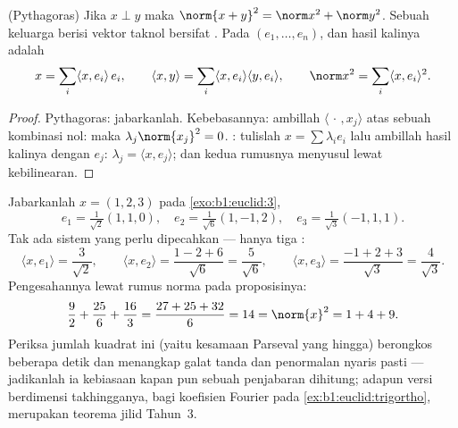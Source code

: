 \begin{proposition}\label{prop:b1:euclid:orthfree}
(Pythagoras) Jika $x \perp y$ maka
$\norm{x+y}^2 = \norm x^2 + \norm y^2$. Sebuah keluarga  berisi
vektor taknol bersifat . Pada   $(e_1, \dots,
e_n)$,  dan hasil kalinya adalah
\[
x = \sum_{i} \langle x, e_i\rangle\, e_i,
\qquad
\langle x, y \rangle = \sum_i \langle x, e_i\rangle \langle y,
e_i\rangle,
\qquad
\norm x^2 = \sum_i \langle x, e_i\rangle^2 .
\]
\end{proposition}

\begin{proof}
Pythagoras: jabarkanlah. Kebebasannya: ambillah $\langle\,\cdot\,, x_j\rangle$
atas sebuah kombinasi nol: maka $\lambda_j \norm{x_j}^2 = 0$. :
tulislah $x = \sum \lambda_i e_i$ lalu ambillah hasil kalinya dengan $e_j$:
$\lambda_j = \langle x, e_j\rangle$; dan kedua rumusnya menyusul lewat
kebilinearan.
\end{proof}

\begin{example}
\label{ex:b1:euclid:parsevalcheck}
Jabarkanlah $x = (1, 2, 3)$ pada  
\cref{exo:b1:euclid:3},
\[
e_1 = \tfrac{1}{\sqrt2}(1,1,0), \quad
e_2 = \tfrac{1}{\sqrt6}(1,-1,2), \quad
e_3 = \tfrac{1}{\sqrt3}(-1,1,1).
\]
Tak ada sistem yang perlu dipecahkan --- hanya tiga :
\[
\langle x, e_1\rangle = \frac{3}{\sqrt2},
\qquad
\langle x, e_2\rangle = \frac{1 - 2 + 6}{\sqrt6} =
\frac{5}{\sqrt6},
\qquad
\langle x, e_3\rangle = \frac{-1 + 2 + 3}{\sqrt3} =
\frac{4}{\sqrt3}.
\]
Pengesahannya lewat rumus norma pada proposisinya:
\[
\frac{9}{2} + \frac{25}{6} + \frac{16}{3}
= \frac{27 + 25 + 32}{6} = 14 = \norm{x}^2 = 1 + 4 + 9 .
\]
Periksa jumlah kuadrat  ini (yaitu kesamaan Parseval yang
hingga) berongkos beberapa detik dan menangkap galat tanda dan
penormalan nyaris pasti --- jadikanlah ia kebiasaan kapan pun sebuah
penjabaran  dihitung; adapun versi berdimensi takhingganya,
bagi koefisien Fourier pada
\cref{ex:b1:euclid:trigortho}, merupakan teorema jilid Tahun~3.
\end{example}


